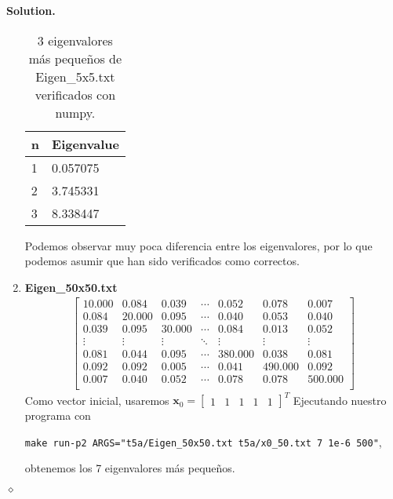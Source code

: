 \documentclass{article}
\theoremstyle{problemstyle}
\newenvironment{solution}{%
  \begin{mdframed}[linewidth=0.8pt,linecolor=Gray,backgroundcolor=Gray!5,roundcorner=5pt]%
  \noindent\textbf{Solution.}%
}{%
\hfill $ \diamond $ 
  \end{mdframed}%
}
\begin{document}
\begin{solution}
\begin{enumerate}
\begin{table}[H]
\begin{center}
				      \begin{tabular}{|l|l|}
					      \hline
					      n & Eigenvalue \\
					      \hline
					      1 & 0.057075 \\
					      \hline
					      2 & 3.745331\\
					      \hline
					      3 & 8.338447   \\
					      \hline
				      \end{tabular}
			      \end{center}
			      \caption{3 eigenvalores m\'as peque\~nos de Eigen\_5x5.txt verificados con numpy.}\label{tab:invpy5x5}
		      \end{table}
		      Podemos observar muy poca diferencia entre los eigenvalores, por lo
		      que podemos asumir que han sido verificados como correctos.
        \item \textbf{Eigen\_50x50.txt}
		      \begin{align*}
			      \begin{bmatrix}
				      10.000 & 0.084  & 0.039  & \cdots & 0.052   & 0.078   & 0.007   \\
				      0.084  & 20.000 & 0.095  & \cdots & 0.040   & 0.053   & 0.040   \\
				      0.039  & 0.095  & 30.000 & \cdots & 0.084   & 0.013   & 0.052   \\
				      \vdots & \vdots & \vdots & \ddots & \vdots  & \vdots  & \vdots  \\
				      0.081  & 0.044  & 0.095  & \cdots & 380.000 & 0.038   & 0.081   \\
				      0.092  & 0.092  & 0.005  & \cdots & 0.041   & 490.000 & 0.092   \\
				      0.007  & 0.040  & 0.052  & \cdots & 0.078   & 0.078   & 500.000 \\
			      \end{bmatrix}
		      \end{align*}
		      Como vector inicial, usaremos $ \mathbf{x}_0 = \begin{bmatrix}
				      1 & 1 & 1 & 1 & 1
			      \end{bmatrix}^{T} $
		      Ejecutando nuestro programa con
		      \begin{center}
			      \texttt{make run-p2
				      ARGS="t5a/Eigen\_50x50.txt t5a/x0\_50.txt 7 1e-6 500"},
		      \end{center}
		      obtenemos los 7 eigenvalores m\'as peque\~nos.
		      \begin{table}[H]

\end{table}
\end{enumerate}
\end{solution}
\end{document}
